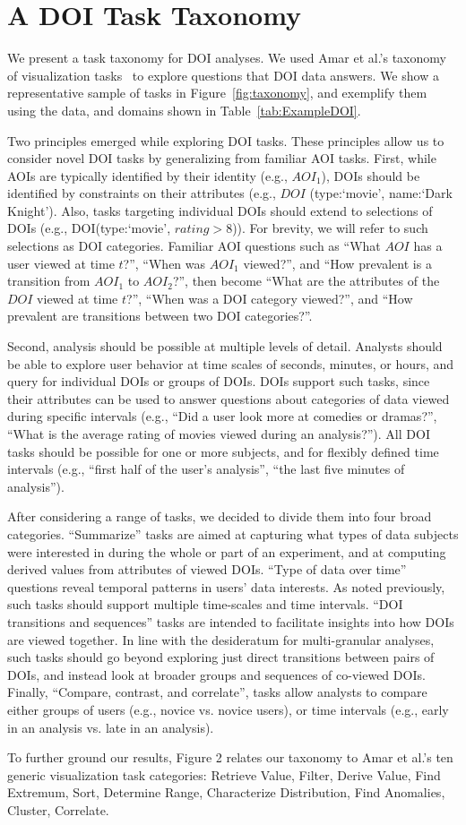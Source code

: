 \section{A DOI Task Taxonomy}
\label{sec:Taxonomy}

We present a task taxonomy for DOI analyses. We used Amar et al.'s taxonomy of visualization tasks~\cite{amar2005low} to explore questions that DOI data answers. We show a representative sample of tasks in Figure~\ref{fig:taxonomy}, and exemplify them using the data, and domains shown in Table~\ref{tab:ExampleDOI}.

Two principles emerged while exploring DOI tasks. These principles allow us to consider novel DOI tasks by generalizing from familiar AOI tasks. First, while AOIs are typically identified by their identity (e.g., $AOI_1$), DOIs should be identified by constraints on their attributes (e.g., $DOI$ (type:`movie', name:`Dark Knight'). Also, tasks targeting individual DOIs should extend to selections of DOIs (e.g., DOI(type:`movie', $rating>8$)). For brevity, we will refer to such selections as DOI categories. Familiar AOI questions such as ``What $AOI$ has a user viewed at time $t$?'', ``When was $AOI_1$ viewed?'', and ``How prevalent is a transition from $AOI_1$ to $AOI_2$?'', then become ``What are the attributes of the $DOI$ viewed at time $t$?'', ``When was a DOI category viewed?'', and ``How prevalent are transitions between two DOI categories?''.

Second, analysis should be possible at multiple levels of detail. Analysts should be able to explore user behavior at time scales of seconds, minutes, or hours, and query for individual DOIs or groups of DOIs. DOIs support such tasks, since their attributes can be used to answer questions about categories of data viewed during specific intervals (e.g., ``Did a user look more at comedies or dramas?'', ``What is the average rating of movies viewed during an analysis?''). All DOI tasks should be possible for one or more subjects, and for flexibly defined time intervals (e.g., ``first half of the user's analysis'', ``the last five minutes of analysis'').

After considering a range of tasks, we decided to divide them into four broad categories. ``Summarize'' tasks are aimed at capturing what types of data subjects were interested in during the whole or part of an experiment, and at computing derived values from attributes of viewed DOIs.  ``Type of data over time'' questions reveal temporal patterns in users' data interests. As noted previously, such tasks should support multiple time-scales and time intervals. ``DOI transitions and sequences'' tasks are intended to facilitate insights into how DOIs are viewed together. In line with the desideratum for multi-granular analyses, such tasks should go beyond exploring just direct transitions between pairs of DOIs, and instead look at broader groups and sequences of co-viewed DOIs. Finally, ``Compare, contrast, and correlate'', tasks allow analysts to compare either groups of users (e.g., novice vs. novice users), or time intervals (e.g., early in an analysis vs. late in an analysis).

To further ground our results, Figure 2 relates our taxonomy to Amar et al.'s ten generic visualization task categories: Retrieve Value, Filter, Derive Value, Find Extremum, Sort, Determine Range, Characterize Distribution, Find Anomalies, Cluster, Correlate.
